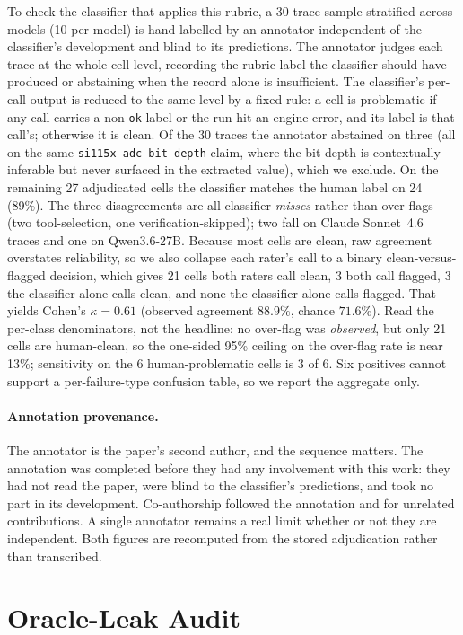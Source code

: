 \documentclass[11pt]{article}
\begin{document}
To check the classifier that applies this rubric, a 30-trace sample
stratified across models (10 per model) is hand-labelled by an
annotator independent of the classifier's development and blind to its
predictions. The annotator judges each trace at the whole-cell level,
recording the rubric label the classifier should have produced or
abstaining when the record alone is insufficient. The classifier's
per-call output is reduced to the same level by a fixed rule: a cell is
problematic if any call carries a non-\texttt{ok} label or the run hit
an engine error, and its label is that call's; otherwise it is clean.
Of the 30 traces the annotator abstained on three (all on the same
\texttt{si115x-adc-bit-depth} claim, where the bit depth is contextually
inferable but never surfaced in the extracted value), which we exclude.
On the remaining 27 adjudicated cells the classifier matches the human
label on 24 (89\%). The three disagreements are all classifier
\emph{misses} rather than over-flags (two tool-selection, one
verification-skipped); two fall on Claude Sonnet~4.6 traces and one on
Qwen3.6-27B. Because most cells are clean, raw agreement overstates
reliability, so we also collapse each rater's
call to a binary clean-versus-flagged decision, which gives 21 cells
both raters call clean, 3 both call flagged, 3 the classifier alone
calls clean, and none the classifier alone calls flagged. That yields
Cohen's $\kappa=0.61$ (observed agreement $88.9\%$, chance $71.6\%$).
Read the per-class denominators, not the headline: no over-flag was
\emph{observed}, but only 21 cells are human-clean, so the one-sided
95\% ceiling on the over-flag rate is near 13\%; sensitivity on the
6 human-problematic cells is 3 of 6. Six positives cannot support a
per-failure-type confusion table, so we report the aggregate only.

\paragraph{Annotation provenance.}
The annotator is the paper's second author, and the sequence matters.
The annotation was completed before they had any involvement with this
work: they had not read the paper, were blind to the classifier's
predictions, and took no part in its development. Co-authorship followed
the annotation and for unrelated contributions. A single annotator
remains a real limit whether or not they are independent. Both figures
are recomputed from the stored adjudication rather than transcribed.

\section{Oracle-Leak Audit}
\label{sec:appendix-audit}
\end{document}
